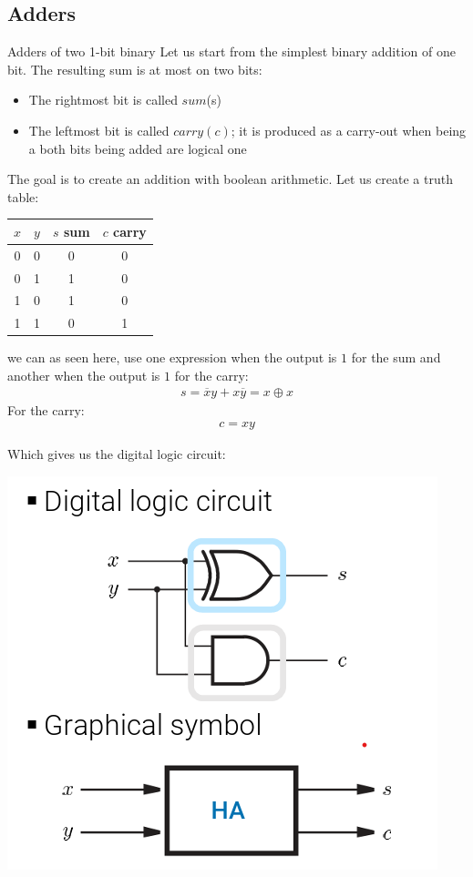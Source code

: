 
\subsection{Adders}
\begin{parag}{Adders of two 1-bit binary}
Let us start from the simplest binary addition of one bit. The resulting sum is at most on two bits:
\begin{itemize}
    \item The rightmost bit is called $sum$(s)
    \item The leftmost bit is called $carry(c)$; it is produced as a carry-out when being a both bits being added are logical one
\end{itemize}
The goal is to create an addition with boolean arithmetic. Let us create a truth table:
\begin{center}
    \begin{tabular}{cccc}
        $x$ & $y$ & $s$ sum & $c$ carry \\
        \hline
        0 & 0 &0&0 \\
        0 & 1 & 1 & 0\\
        1 &0 &1&0\\
        1&1&0&1
\end{tabular}
\end{center}
we can as seen here, use one expression when the output is $1$ for the sum and another when the output is $1$ for the carry:
\begin{align*}
    s = \overline{x}y + x \overline{y} = x \oplus x
\end{align*}
For the carry:
\begin{align*}
    c = xy
\end{align*}

Which gives us the digital logic circuit:
\begin{center}
    \includegraphics[scale=0.7]{12025-03-14.png}
\end{center}


\end{parag}

